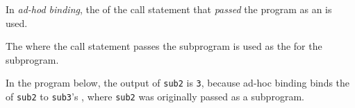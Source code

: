 \begin{definition}\label{def:Ad_Hoc_Binding}
  In \emph{ad-hod binding}, the  of the call statement that \emph{passed} the program as an  is used.

  The  where the call statement passes the subprogram is used as the  for the subprogram.

  \begin{remark}\label{rmk:Ad_Hoc_Binding-Program_Output}
    In the program below, the output of \texttt{sub2} is \texttt{3}, because ad-hoc binding binds the  of \texttt{sub2} to \texttt{sub3}'s , where \texttt{sub2} was originally passed as a subprogram.
  \end{remark}
\end{definition}
